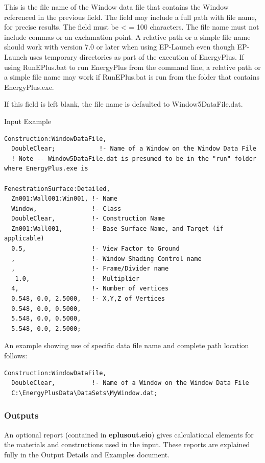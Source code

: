 This is the file name of the Window data file that contains the Window referenced in the previous field. The field may include a full path with file name, for precise results. The field must be \textless{} = 100 characters. The file name must not include commas or an exclamation point. A relative path or a simple file name should work with version 7.0 or later when using EP-Launch even though EP-Launch uses temporary directories as part of the execution of EnergyPlus. If using RunEPlus.bat to run EnergyPlus from the command line, a relative path or a simple file name may work if RunEPlus.bat is run from the folder that contains EnergyPlus.exe.

If this field is left blank, the file name is defaulted to Window5DataFile.dat.

Input Example

\begin{lstlisting}
Construction:WindowDataFile,
  DoubleClear;            !- Name of a Window on the Window Data File
  ! Note -- Window5DataFile.dat is presumed to be in the "run" folder where EnergyPlus.exe is

FenestrationSurface:Detailed,
  Zn001:Wall001:Win001, !- Name
  Window,               !- Class
  DoubleClear,          !- Construction Name
  Zn001:Wall001,        !- Base Surface Name, and Target (if applicable)
  0.5,                  !- View Factor to Ground
  ,                     !- Window Shading Control name
  ,                     !- Frame/Divider name
   1.0,                 !- Multiplier
  4,                    !- Number of vertices
  0.548, 0.0, 2.5000,   !- X,Y,Z of Vertices
  0.548, 0.0, 0.5000,
  5.548, 0.0, 0.5000,
  5.548, 0.0, 2.5000;
\end{lstlisting}

An example showing use of specific data file name and complete path location follows:

\begin{lstlisting}
Construction:WindowDataFile,
  DoubleClear,          !- Name of a Window on the Window Data File
  C:\EnergyPlusData\DataSets\MyWindow.dat;
\end{lstlisting}

\subsubsection{Outputs}\label{outputs-4-016}

An optional report (contained in \textbf{eplusout.eio}) gives calculational elements for the materials and constructions used in the input. These reports are explained fully in the Output Details and Examples document.
